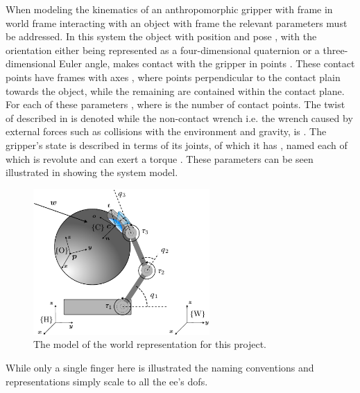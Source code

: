 When modeling the kinematics of an anthropomorphic gripper with frame  in world frame  interacting with an object with frame  the relevant parameters must be addressed. In this system the object with position  and pose , with the orientation either being represented as a four-dimensional quaternion or a three-dimensional Euler angle, makes contact with the gripper in points . These contact points have frames  with axes , where  points perpendicular to the contact plain towards the object, while the remaining are contained within the contact plane. For each of these parameters , where  is the number of contact points. The twist of  described in  is denoted  while the non-contact wrench i.e. the wrench caused by external forces such as collisions with the environment and gravity, is . The gripper's state is described in terms of its joints, of which it has , named  each of which is revolute and can exert a torque . These parameters can be seen illustrated in  showing the system model.
%
\begin{figure}[h]
	\begin{small}
		\begin{center}
			\includegraphics[width=0.6\textwidth]{chapters/modeling/fig/sys-schematic.pdf}
		\end{center}
		\caption{The model of the world representation for this project.}
		\label{fig:sys-schematic}
	\end{small}
\end{figure}
%
While only a single finger here is illustrated the naming conventions and representations simply scale to all the \gls{ee}'s \gls{dof}s.\medskip


